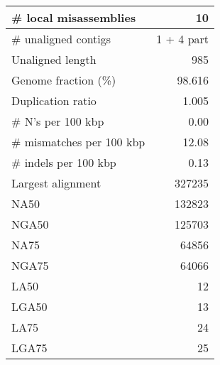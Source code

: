 \documentclass[12pt,a4paper]{article}
\begin{document}
\begin{table}[ht]
\begin{center}
\begin{tabular}{|l*{1}{|r}|}
\# local misassemblies & 10 \\ \hline
\# unaligned contigs & 1 + 4 part \\ \hline
Unaligned length & 985 \\ \hline
Genome fraction (\%) & 98.616 \\ \hline
Duplication ratio & 1.005 \\ \hline
\# N's per 100 kbp & 0.00 \\ \hline
\# mismatches per 100 kbp & 12.08 \\ \hline
\# indels per 100 kbp & 0.13 \\ \hline
Largest alignment & 327235 \\ \hline
NA50 & 132823 \\ \hline
NGA50 & 125703 \\ \hline
NA75 & 64856 \\ \hline
NGA75 & 64066 \\ \hline
LA50 & 12 \\ \hline
LGA50 & 13 \\ \hline
LA75 & 24 \\ \hline
LGA75 & 25 \\ \hline
\end{tabular}
\end{center}
\end{table}
\end{document}
